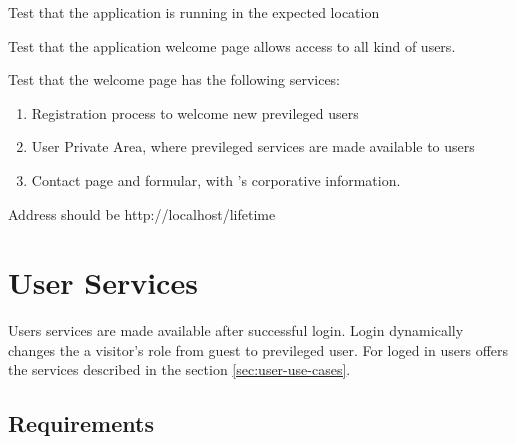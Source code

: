 \begin{test}
  Test that the application is running in the expected location
\end{test}
\begin{test}
  Test that the application welcome page allows access to all kind of
  users.
\end{test}
\begin{test}
  Test that the welcome page has the following services:
  \begin{enumerate}
  \item Registration process to welcome new previleged users
  \item User Private Area, where previleged services are made
    available to users
  \item Contact page and formular, with \lifetime's corporative
    information.
  \end{enumerate}
\end{test}
\begin{todo}
  Address should be http://localhost/lifetime
\end{todo}













\section{User Services}
\label{sec:user-use-services}
Users services are made available after successful login. Login
dynamically changes the a visitor's role from guest to previleged
user. For loged in users \lifetime offers the services described in
the section \ref{sec:user-use-cases}.

\subsection{Requirements}
\label{sec:user-requirements}

